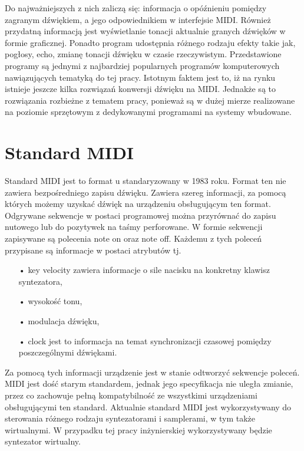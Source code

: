 Do najważniejszych z nich zaliczą się: informacja o opóźnieniu pomiędzy zagranym dźwiękiem, a jego odpowiednikiem w interfejsie MIDI.
Również przydatną informacją jest wyświetlanie tonacji aktualnie granych dźwięków w formie graficznej. Ponadto program udostępnia różnego rodzaju efekty takie jak, pogłosy, echo, zmianę tonacji dźwięku w czasie rzeczywistym.
Przedstawione programy są jednymi z najbardziej popularnych programów komputerowych nawiązujących tematyką do tej pracy. Istotnym faktem jest to, iż na rynku istnieje jeszcze kilka rozwiązań konwersji dźwięku na MIDI. Jednakże są to rozwiązania rozbieżne z tematem pracy, ponieważ są w dużej mierze realizowane na poziomie sprzętowym z dedykowanymi programami na systemy wbudowane.


\section{{Standard MIDI}}

Standard MIDI \cite{MIDI} jest to format u standaryzowany w 1983 roku. Format ten nie zawiera bezpośredniego zapisu dźwięku. Zawiera szereg informacji, za pomocą których możemy uzyskać dźwięk na urządzeniu obsługującym ten format. Odgrywane sekwencje w postaci programowej można przyrównać do zapisu nutowego lub do pozytywek na taśmy perforowane. W formie sekwencji zapisywane są polecenia note on oraz note off. Każdemu z tych poleceń przypisane są informacje w postaci atrybutów tj.

\begin{itemize}
\item[•]{key velocity zawiera informacje o sile nacisku na konkretny klawisz syntezatora,}
\item[•]{wysokość tonu,}
\item[•]{modulacja dźwięku,}
\item[•]{clock jest to informacja na temat synchronizacji czasowej pomiędzy poszczególnymi dźwiękami.}
\end{itemize}

Za pomocą tych informacji urządzenie jest w stanie odtworzyć sekwencje poleceń.  MIDI jest dość starym standardem, jednak jego specyfikacja nie uległa zmianie, przez co zachowuje pełną kompatybilność ze wszystkimi urządzeniami obsługującymi ten standard. Aktualnie standard MIDI jest wykorzystywany do sterowania różnego rodzaju syntezatorami i samplerami, w tym także wirtualnymi. W przypadku tej pracy inżynierskiej wykorzystywany będzie syntezator wirtualny. 


